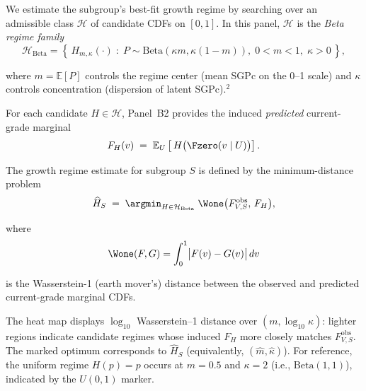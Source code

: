 \documentclass[10pt]{article}
\begin{document}
\noindent
\begin{minipage}[t]{3.75in}
  \vspace{0.05in}
  \hspace{0.15in}%
  \begin{minipage}{3.45in}
    \small\raggedright\color{bodyGrey}

    We estimate the subgroup's best-fit growth regime by searching 
    over an admissible class $\mathcal{H}$ of candidate CDFs on $[0,1]$.
    In this panel, $\mathcal{H}$ is the \emph{Beta regime family}
    \[
      \mathcal{H}_{\mathrm{Beta}}
      =\left\{\,H_{m,\kappa}(\cdot)\;:\;P\sim\mathrm{Beta}(\kappa m,\kappa(1-m)),\;0<m<1,\;\kappa>0\,\right\},
    \]
    
    \vspace{1pt}
    where $m=\mathbb{E}[P]$ controls the regime center (mean SGPc on the 0--1 scale) and
    $\kappa$ controls concentration (dispersion of latent SGPc).$^\mbox{2}$
    
    \vspace{4pt}
    For each candidate $H\in\mathcal{H}$, Panel~B2 provides the 
    induced \emph{predicted} current-grade marginal
    \[
      F_{H}(v)\;=\;\mathbb{E}_{U}\left[\,H\bigl(\Fzero(v\mid U)\bigr)\right].
    \]

    \vspace{1pt}
    The growth regime estimate for subgroup $S$ is defined by the minimum-distance problem
    \[
      \widehat{H}_S \;=\;
      \argmin_{H\in\mathcal{H}_{\mathrm{Beta}}}\;
      \Wone\bigl(F^{\mathrm{obs}}_{V,S},\,F_{H}\bigr),
    \]

    \vspace{1pt}
    where
    \[
      \Wone(F,G)=\int_0^1 \bigl|F(v)-G(v)\bigr|\,dv
    \]

    \vspace{1pt}
    is the Wasserstein-1 (earth mover's) distance between the observed and predicted current-grade marginal CDFs. 
    
    \vspace{4pt}
    The heat map displays $\log_{10}$ Wasserstein--1 distance over $(m,\log_{10}\kappa)$:
    lighter regions indicate candidate regimes whose induced $F_H$ more closely 
    matches $F^{\mathrm{obs}}_{V,S}$. The marked optimum corresponds to $\widehat{H}_S$ 
    (equivalently, $(\hat m,\hat\kappa)$). For reference, the uniform regime $H(p)=p$ 
    occurs at $m=0.5$ and $\kappa=2$ (i.e., $\mathrm{Beta}(1,1)$), indicated by the $U(0,1)$ marker.

  \end{minipage}
  \vspace{0.1in}
\end{minipage}
\end{document}
